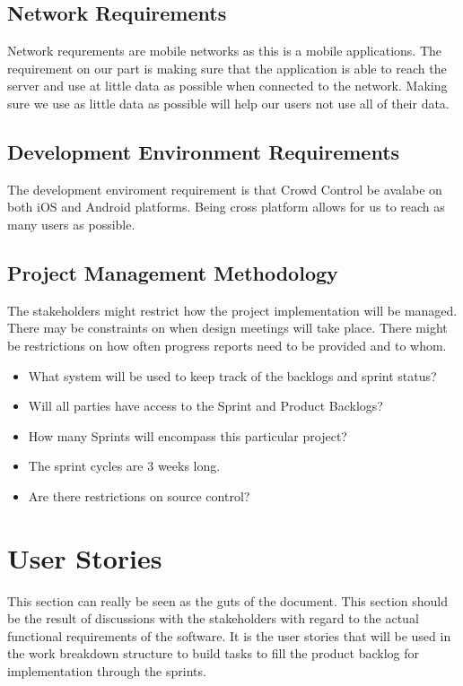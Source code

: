 \subsection{Network Requirements}
Network requrements are mobile networks as this is a mobile applications. The requirement on our part is making sure that the application is able to reach the server and use at little data as possible when connected to the network. Making sure we use as little data as possible will help our users not use all of their data. 


\subsection{Development Environment Requirements}
The development enviroment requirement is that Crowd Control be avalabe on both iOS and Android platforms. Being cross platform allows for us to reach as many users as possible.


\subsection{Project  Management Methodology}
The stakeholders might restrict how the project implementation will be managed. 
 There may be constraints on when design meetings will take place.  There might 
be restrictions on how often progress reports need to be provided and to whom. 
 
\begin{itemize}
\item What system will be used to keep track of the backlogs and sprint status?
\item Will all parties have access to the Sprint and Product Backlogs?
\item How many Sprints will encompass this particular project?
\item The sprint cycles are 3 weeks long.
\item Are there restrictions on source control? 
\end{itemize}

\section{User Stories}
This section can really be seen as the guts of the document.  This section should 
be the result of discussions with the stakeholders with regard to the actual functional 
requirements of the software.  It is the user stories that will be used in the 
work breakdown structure to build tasks to fill the product backlog for implementation 
through the sprints.

